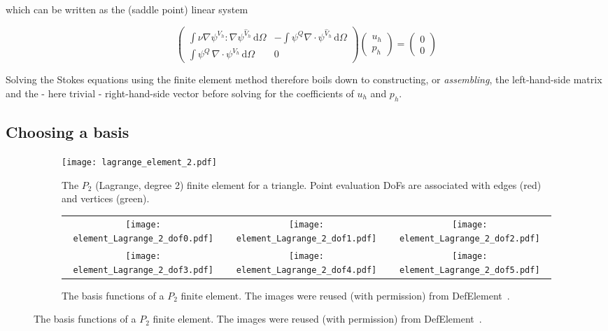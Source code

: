 \documentclass[thesis]{subfiles}
\begin{document}
which can be written as the (saddle point) linear system


\begin{equation}
  \left (
  \begin{array}{c|c}
    \int \nu \nabla \psi^{V_h} : \nabla \psi^{\hat V_h} \, \textrm{d}\Omega
    &
    - \int \psi^Q \nabla \cdot \psi^{\hat V_h} \, \textrm{d}\Omega \\
    \hline
    \int \psi^Q \, \nabla \cdot \psi^{V_h} \, \textrm{d}\Omega
    &
    0
  \end{array}
  \right )
  \left (
  \begin{array}{c}
    u_h \\
    \hline
    p_h
  \end{array}
  \right )
  =
  \left (
  \begin{array}{c}
    0 \\ \hline 0
  \end{array}
  \right )
  \label{eq:stokes_linear_system}
\end{equation}

Solving the Stokes equations using the finite element method therefore boils down to constructing, or \textit{assembling}, the left-hand-side matrix and the - here trivial - right-hand-side vector before solving for the coefficients of $u_h$ and $p_h$.

\subsection{Choosing a basis}

\begin{figure}
  \centering
  \begin{subfigure}{.4\textwidth}
    \centering
    \texttt{[image: lagrange\_element\_2.pdf]}
    \vspace{1em}
    \caption{
      The $P_2$ (Lagrange, degree 2) finite element for a triangle.
      Point evaluation DoFs are associated with edges (red) and vertices (green).
    }
    \label{fig:lagrange_element_2}
  \end{subfigure}
  \begin{subfigure}{.58\textwidth}
    \centering
    \begin{tabular}{c c c}
      \texttt{[image: element\_Lagrange\_2\_dof0.pdf]}
      &
      \texttt{[image: element\_Lagrange\_2\_dof1.pdf]}
      &
      \texttt{[image: element\_Lagrange\_2\_dof2.pdf]}
      \\
      \texttt{[image: element\_Lagrange\_2\_dof3.pdf]}
      &
      \texttt{[image: element\_Lagrange\_2\_dof4.pdf]}
      &
      \texttt{[image: element\_Lagrange\_2\_dof5.pdf]}
    \end{tabular}
    \caption{
      The basis functions of a $P_2$ finite element.
      The images were reused (with permission) from DefElement~\cite{defelement}.
    }
    \label{fig:lagrange_element_2_basis}
  \end{subfigure}
\end{figure}
\end{document}
